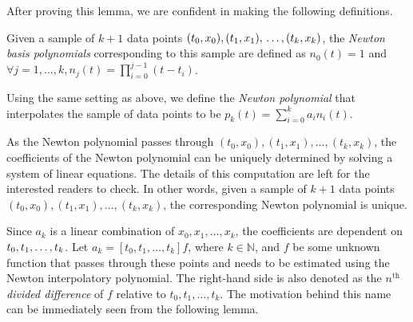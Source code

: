 \documentclass[a4paper,11pt,titlepage]{article}
\theoremstyle{definition}
\theoremstyle{plain}
\theoremstyle{remark}
\begin{document}
After proving this lemma, we are confident in making the following definitions.

Given a sample of $k+1$ data points
$(t_0,x_0), (t_1,x_1), \\\dots, (t_k,x_k)$, the \textit{Newton basis polynomials} corresponding to this sample are defined as $n_0(t)=1$ and $\forall j=1,...,k, n_j(t)=\prod_{i=0}^{j-1}(t-t_i)$.

Using the same setting as above, we define the \textit{Newton polynomial} that interpolates the sample of data points to be $p_k(t)=\sum_{i=0}^ka_in_i(t)$.

As the Newton polynomial passes through $(t_0,x_0), (t_1,x_1), \dots, (t_k,x_k)$, the coefficients of the Newton polynomial can be uniquely determined by solving a system of linear equations. The details of this computation are left for the interested readers to check. In other words, given a sample of $k+1$ data points
$(t_0,x_0), (t_1,x_1), \dots, (t_k,x_k)$, the corresponding Newton polynomial is unique.

Since $a_k$ is a linear combination of $x_0,x_1,\dots,x_k$, the coefficients are dependent on $t_0,t_1,\dots,\\t_k$. Let $a_k=[t_0,t_1,\dots,t_k]f$, where $k\in\mathbb{N}$, and $f$ be some unknown function that passes through these points and needs to be estimated using the Newton interpolatory polynomial. The right-hand side is also denoted as the $n^{\mathrm{th}}$ \textit{divided difference} of $f$ relative to $t_0,t_1,\dots,t_k$. The motivation behind this name can be immediately seen from the following lemma.
\end{document}
